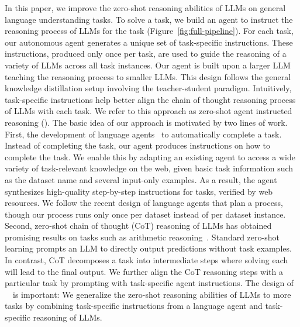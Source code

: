 In this paper, we improve the zero-shot reasoning abilities of LLMs on general language understanding tasks. To solve a task, we build an agent to instruct the reasoning process of LLMs for the task (Figure~\ref{fig:full-pipeline}). For each task, our autonomous agent generates a unique set of task-specific instructions. These instructions, produced only once per task, are used to guide the reasoning of a variety of LLMs across all task instances. Our agent is built upon a larger LLM teaching the reasoning process to smaller LLMs. This design follows the general knowledge distillation setup involving the teacher-student paradigm. Intuitively, task-specific instructions help better align the chain of thought reasoning process of LLMs with each task. We refer to this approach as zero-shot agent instructed reasoning (\method). The basic idea of our approach is motivated by two lines of work. First, the development of language agents~\citep{yao2023react, shinn2023reflexion, park2023generative, wang2023survey, xi2023rise} to automatically complete a task. Instead of completing the task, our agent produces instructions on how to complete the task. We enable this by adapting an existing agent to access a wide variety of task-relevant knowledge on the web, given basic task information such as the dataset name and several input-only examples. As a result, the agent synthesizes high-quality step-by-step instructions for tasks, verified by web resources. We follow the recent design of language agents that plan a process, though our process runs only once per dataset instead of per dataset instance. Second, zero-shot chain of thought (CoT) reasoning of LLMs has obtained promising results on tasks such as arithmetic reasoning~\citep{kojima2023large, wang2023planandsolve}. Standard zero-shot learning prompts an LLM to directly output predictions without task examples. In contrast, CoT decomposes a task into intermediate steps where solving each will lead to the final output. We further align the CoT reasoning steps with a particular task by prompting with task-specific agent instructions. The design of \zeroshotmid\ \method\ is important: We generalize the zero-shot reasoning abilities of LLMs to more tasks by combining task-specific instructions from a language agent and task-specific reasoning of LLMs.

